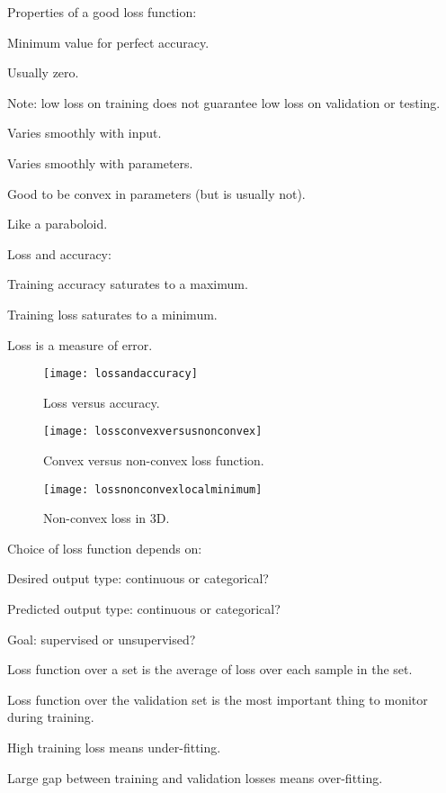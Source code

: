 Properties of a good loss function:
	\begin{bulletedlist}
		\item Minimum value for perfect accuracy.
		\begin{bulletedlist}
			\item Usually zero.
			\item Note: low loss on training does not guarantee low loss on validation or testing.
		\end{bulletedlist}
		\item Varies smoothly with input.
		\item Varies smoothly with parameters.
		\item Good to be convex in parameters (but is usually not).
		\begin{bulletedlist}
			\item Like a paraboloid.
		\end{bulletedlist}
	\end{bulletedlist}

Loss and accuracy:
	\begin{bulletedlist}
		\item Training accuracy saturates to a maximum.
		\item Training loss saturates to a minimum.
		\item Loss is a measure of error.
	\end{bulletedlist}
 	\begin{figure}[h]
		\centering
		\texttt{[image: lossandaccuracy]}
		\caption[Loss versus accuracy]{Loss versus accuracy.}
		\label{fig:lossandaccuracy}
	\end{figure}
 	\begin{figure}[h]
		\centering
		\texttt{[image: lossconvexversusnonconvex]}
		\caption[Convex versus non-convex loss function]{Convex versus non-convex loss function.}
		\label{fig:lossconvexversusnonconvex}
	\end{figure}
 	\begin{figure}[h]
		\centering
		\texttt{[image: lossnonconvexlocalminimum]}
		\caption[Non-convex loss in 3D]{Non-convex loss in 3D.}
		\label{fig:lossnonconvexlocalminimum}
	\end{figure}



Choice of loss function depends on:
	\begin{bulletedlist}
		\item Desired output type: continuous or categorical?
		\item Predicted output type: continuous or categorical?
		\item Goal: supervised or unsupervised?
		\item Loss function over a set is the average of loss over each sample in the set.
		\item Loss function over the validation set is the most important thing to monitor during training.
		\item High training loss means under-fitting.
		\item Large gap between training and validation losses means over-fitting.
	\end{bulletedlist}

